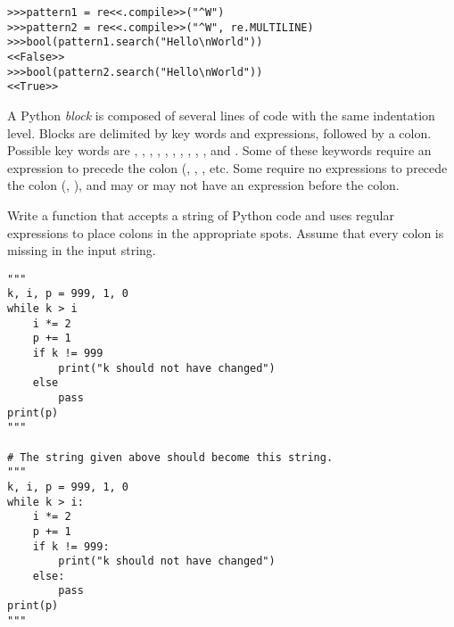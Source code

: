 \begin{lstlisting}
>>>pattern1 = re<<.compile>>("^W")
>>>pattern2 = re<<.compile>>("^W", re.MULTILINE)
>>>bool(pattern1.search("Hello\nWorld"))
<<False>>
>>>bool(pattern2.search("Hello\nWorld"))
<<True>>
\end{lstlisting}

\begin{problem}
A Python \emph{block} is composed of several lines of code with the same indentation level.
Blocks are delimited by key words and expressions, followed by a colon.
Possible key words are , , , , , , , , , , and .
Some of these keywords require an expression to precede the colon (, , , etc.
Some require no expressions to precede the colon (, ), and  may or may not have an expression before the colon.

Write a function that accepts a string of Python code and uses regular expressions to place colons in the appropriate spots.
Assume that every colon is missing in the input string.

\begin{lstlisting}
"""
k, i, p = 999, 1, 0
while k > i
    i *= 2
    p += 1
    if k != 999
        print("k should not have changed")
    else
        pass
print(p)
"""

# The string given above should become this string.
"""
k, i, p = 999, 1, 0
while k > i:
    i *= 2
    p += 1
    if k != 999:
        print("k should not have changed")
    else:
        pass
print(p)
"""
\end{lstlisting}
\end{problem}

